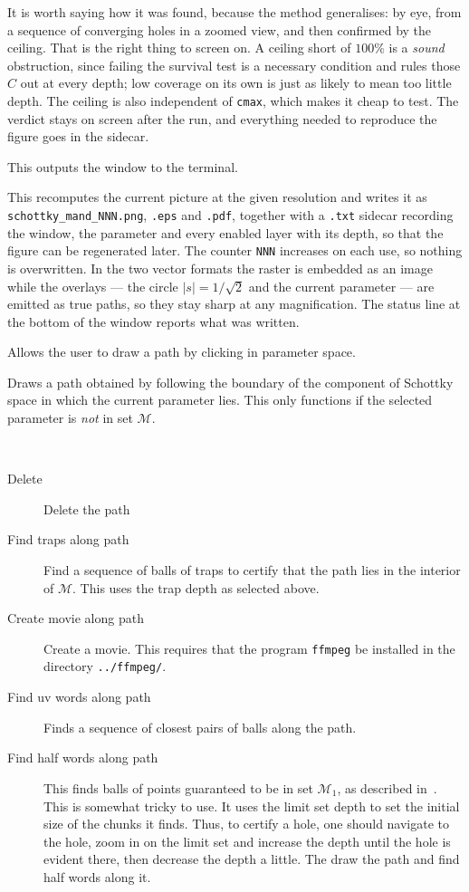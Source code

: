 \documentclass{amsart}
\begin{document}
\begin{description}
It is worth saying how it was found, because the method generalises: by eye, from a sequence of
converging holes in a zoomed view, and then confirmed by the ceiling.  That is the right thing to
screen on.  A ceiling short of $100\%$ is a \emph{sound} obstruction, since failing the survival
test is a necessary condition and rules those $C$ out at every depth; low coverage on its own is
just as likely to mean too little depth.  The ceiling is also independent of \texttt{cmax}, which
makes it cheap to test.  The verdict stays on screen after the
run, and everything needed to reproduce the figure goes in the sidecar.
\item[Write window coords] This outputs the window to the terminal.
\item[Write picture]  This recomputes the current picture at the given resolution
and writes it as \texttt{schottky\_mand\_NNN.png}, \texttt{.eps} and \texttt{.pdf},
together with a \texttt{.txt} sidecar recording the window, the parameter and every
enabled layer with its depth, so that the figure can be regenerated later.  The counter
\texttt{NNN} increases on each use, so nothing is overwritten.  In the two vector formats
the raster is embedded as an image while the overlays --- the circle $|s|=1/\sqrt2$ and
the current parameter --- are emitted as true paths, so they stay sharp at any
magnification.  The status line at the bottom of the window reports what was written.
\item[Draw path] Allows the user to draw a path by clicking in parameter space.
\item[Find boundary path] Draws a path obtained by following the boundary of 
the component of Schottky space in which the current parameter lies.  
This only functions if the selected parameter is \emph{not} in set $\mathcal{M}$.
\vspace{5mm}
\item[Path options] ~
\begin{description}
\item[Delete] Delete the path
\item[Find traps along path] Find a sequence of balls of traps to certify that the
path lies in the interior of $\mathcal{M}$.  This uses the trap depth
as selected above.
\item[Create movie along path] Create a movie.  This requires that the 
program \texttt{ffmpeg} be installed in the directory \texttt{../ffmpeg/}.
\item[Find uv words along path] Finds a sequence of closest pairs of balls 
along the path.
\item[Find half words along path] This finds balls of points guaranteed to be in 
set $\mathcal{M}_1$, as described in~\cite{paper}.  This is somewhat tricky to use.
It uses the limit set depth to set the initial size of the chunks it finds.
Thus, to certify a hole, one should navigate to the hole, zoom in on the limit set 
and increase the depth until the hole is evident there, then decrease the depth a little.
The draw the path and find half words along it.
\end{description}
\end{description}
\end{document}
